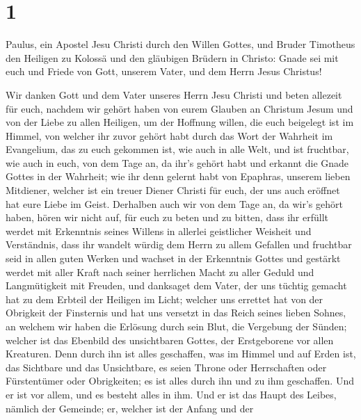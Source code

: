 \hypertarget{section}{%
\section{1}\label{section}}

 Paulus, ein Apostel Jesu Christi durch den Willen Gottes,
und Bruder Timotheus  den Heiligen zu Kolossä und den
gläubigen Brüdern in Christo: Gnade sei mit euch und Friede von Gott,
unserem Vater, und dem Herrn Jesus Christus!

 Wir danken Gott und dem Vater unseres Herrn Jesu Christi
und beten allezeit für euch,  nachdem wir gehört haben von
eurem Glauben an Christum Jesum und von der Liebe zu allen Heiligen,
 um der Hoffnung willen, die euch beigelegt ist im Himmel,
von welcher ihr zuvor gehört habt durch das Wort der Wahrheit im
Evangelium,  das zu euch gekommen ist, wie auch in alle
Welt, und ist fruchtbar, wie auch in euch, von dem Tage an, da ihr's
gehört habt und erkannt die Gnade Gottes in der Wahrheit; 
wie ihr denn gelernt habt von Epaphras, unserem lieben Mitdiener,
welcher ist ein treuer Diener Christi für euch,  der uns
auch eröffnet hat eure Liebe im Geist.  Derhalben auch wir
von dem Tage an, da wir's gehört haben, hören wir nicht auf, für euch zu
beten und zu bitten, dass ihr erfüllt werdet mit Erkenntnis seines
Willens in allerlei geistlicher Weisheit und Verständnis,
 dass ihr wandelt würdig dem Herrn zu allem Gefallen und
fruchtbar seid in allen guten Werken  und wachset in der
Erkenntnis Gottes und gestärkt werdet mit aller Kraft nach seiner
herrlichen Macht zu aller Geduld und Langmütigkeit mit Freuden,
 und danksaget dem Vater, der uns tüchtig gemacht hat zu
dem Erbteil der Heiligen im Licht;  welcher uns errettet
hat von der Obrigkeit der Finsternis und hat uns versetzt in das Reich
seines lieben Sohnes,  an welchem wir haben die Erlösung
durch sein Blut, die Vergebung der Sünden;  welcher ist
das Ebenbild des unsichtbaren Gottes, der Erstgeborene vor allen
Kreaturen.  Denn durch ihn ist alles geschaffen, was im
Himmel und auf Erden ist, das Sichtbare und das Unsichtbare, es seien
Throne oder Herrschaften oder Fürstentümer oder Obrigkeiten; es ist
alles durch ihn und zu ihm geschaffen.  Und er ist vor
allem, und es besteht alles in ihm.  Und er ist das Haupt
des Leibes, nämlich der Gemeinde; er, welcher ist der Anfang und der
